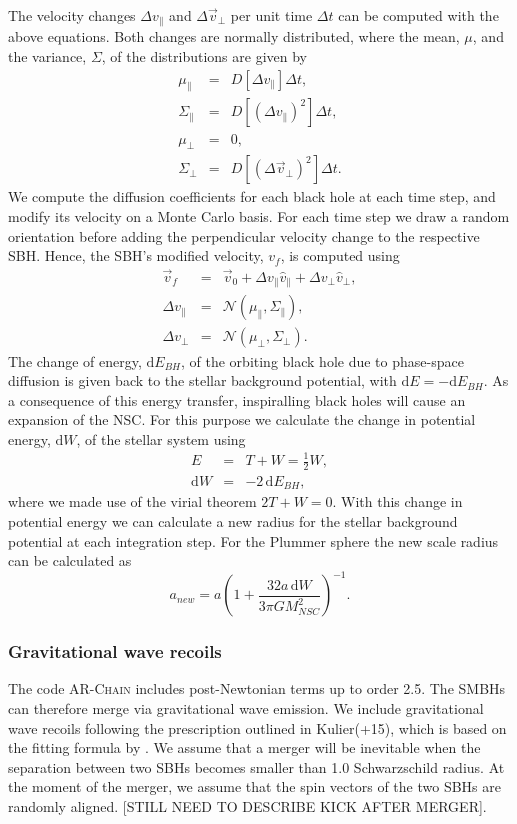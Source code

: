 \documentclass[english, apj]{emulateapj}
\begin{document}
The velocity changes $\Delta v_\parallel$ and $\Delta\vec{v}_\bot$ per unit time $\Delta t$ can be computed with the above equations. Both changes are normally distributed, where the mean, $\mu$, and the variance, $\Sigma$, of the distributions are given by
\begin{eqnarray}
\mu_\parallel &=& D[\Delta v_\parallel]\Delta t,\\
\Sigma_\parallel &=& D[(\Delta v_\parallel)^2]\Delta t,\\
\mu_\bot &=& 0,\\
\Sigma_\bot &=& D[(\Delta \vec{v}_\bot)^2]\Delta t.
\end{eqnarray}
We compute the diffusion coefficients for each black hole at each time step, and modify its velocity on a Monte Carlo basis. For each time step we draw a random orientation before adding the perpendicular velocity change to the respective SBH. Hence, the SBH's modified velocity, $v_f$, is computed using
\begin{eqnarray}
\vec{v}_f &=& \vec{v}_0 + \Delta v_\parallel \hat{v}_\parallel + \Delta v_\bot \hat{v}_\bot,\\
\Delta v_\parallel &=& \mathcal{N}(\mu_\parallel, \Sigma_\parallel),\\
\Delta v_\bot &=& \mathcal{N}(\mu_\bot, \Sigma_\bot).
\end{eqnarray}
The change of energy, $\mbox{d}E_{BH}$, of the orbiting black hole due to phase-space diffusion is given back to the stellar background potential, with $\mbox{d}E = -\mbox{d}E_{BH}$. As a consequence of this energy transfer, inspiralling black holes will cause an expansion of the NSC. For this purpose we calculate the change in potential energy, $\mbox{d}W$, of the stellar system using
\begin{eqnarray}
E &=& T + W = \frac{1}{2}W,\\
\mbox{d}W &=& -2\,\mbox{d}E_{BH},
\end{eqnarray}
where we made use of the virial theorem $2T+W =0$. With this change in potential energy we can calculate a new radius for the stellar background potential at each integration step. For the Plummer sphere the new scale radius can be calculated as
\begin{equation}
a_{new} = a\left(1+\frac{32a\,\mbox{d}W}{3\pi GM_{NSC}^2}\right)^{-1}.
\end{equation}

\subsubsection{Gravitational wave recoils}
The code \textsc{AR-Chain} includes post-Newtonian terms up to order 2.5. The SMBHs can therefore merge via gravitational wave emission. We include gravitational wave recoils following the prescription outlined in Kulier(+15), which is based on the fitting formula by \citet{2012PhRvD..85h4015L}.  We assume that a merger will be inevitable when the separation between two SBHs becomes smaller than 1.0 Schwarzschild radius. At the moment of the merger, we assume that the spin vectors of the two SBHs are randomly aligned. [STILL NEED TO DESCRIBE KICK AFTER MERGER].
\end{document}
